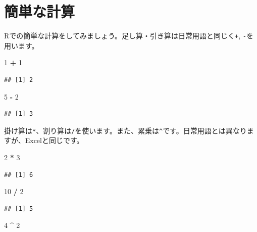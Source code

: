 \documentclass[]{book}
\newenvironment{Shaded}{\begin{snugshade}}{\end{snugshade}}
\newcommand{\DecValTok}[1]{\textcolor[rgb]{0.00,0.00,0.81}{#1}}
\newcommand{\StringTok}[1]{\textcolor[rgb]{0.31,0.60,0.02}{#1}}
\newcommand{\OperatorTok}[1]{\textcolor[rgb]{0.81,0.36,0.00}{\textbf{#1}}}
\begin{document}
\section{簡単な計算}\label{ux7c21ux5358ux306aux8a08ux7b97}

Rでの簡単な計算をしてみましょう。足し算・引き算は日常用語と同じく\texttt{+},
\texttt{-}を用います。

\begin{Shaded}
\begin{Highlighting}[]
\DecValTok{1} \OperatorTok{+}\StringTok{ }\DecValTok{1}
\end{Highlighting}
\end{Shaded}

\begin{verbatim}
## [1] 2
\end{verbatim}

\begin{Shaded}
\begin{Highlighting}[]
\DecValTok{5} \OperatorTok{-}\StringTok{ }\DecValTok{2}
\end{Highlighting}
\end{Shaded}

\begin{verbatim}
## [1] 3
\end{verbatim}

掛け算は\texttt{*}、割り算は\texttt{/}を使います。また、累乗は\texttt{\^{}}です。日常用語とは異なりますが、Excelと同じです。

\begin{Shaded}
\begin{Highlighting}[]
\DecValTok{2} \OperatorTok{*}\StringTok{ }\DecValTok{3}
\end{Highlighting}
\end{Shaded}

\begin{verbatim}
## [1] 6
\end{verbatim}

\begin{Shaded}
\begin{Highlighting}[]
\DecValTok{10} \OperatorTok{/}\StringTok{ }\DecValTok{2}
\end{Highlighting}
\end{Shaded}

\begin{verbatim}
## [1] 5
\end{verbatim}

\begin{Shaded}
\begin{Highlighting}[]
\DecValTok{4} \OperatorTok{^}\StringTok{ }\DecValTok{2}
\end{Highlighting}
\end{Shaded}
\end{document}
